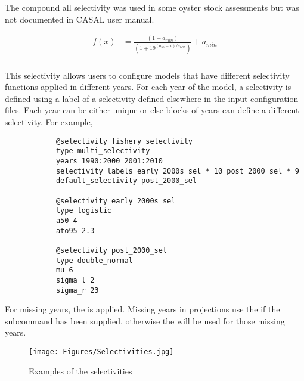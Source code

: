 \subsubsection[Compound-All]{}\label{sec:Selectivity-CompoundAll}

The compound all selectivity was used in some oyster stock assessments but was not documented in CASAL user manual.

\begin{align*}
	f(x)  & = \frac{\left(1 - a_{min}\right)}{\left(1 + 19^{(a_{50} - x)/a_{to95}}\right)}  + a_{min}
\end{align*}

\subsubsection[Multi Selectivity ]{} \label{sec:Selectivity-MultiSelectivities}

This selectivity allows users to configure models that have different selectivity functions applied in different years. For each year of the model, a selectivity is defined using a label of a selectivity defined elsewhere in the input configuration files. Each year can be either unique or else blocks of years can define a different selectivity. For example,

{\small{\begin{verbatim}
			@selectivity fishery_selectivity
			type multi_selectivity
			years 1990:2000 2001:2010
			selectivity_labels early_2000s_sel * 10 post_2000_sel * 9
			default_selectivity post_2000_sel
			
			@selectivity early_2000s_sel
			type logistic
			a50 4
			ato95 2.3
			
			@selectivity post_2000_sel
			type double_normal
			mu 6
			sigma_l 2
			sigma_r 23
\end{verbatim}}}

For missing years, the  is applied. Missing years in projections use the  if the subcommand has been supplied, otherwise the  will be used for those missing years.

\begin{figure}[H]
	\centering
	\texttt{[image: Figures/Selectivities.jpg]}
	\caption{Examples of the selectivities}
	\label{fig:select examples}
\end{figure}

